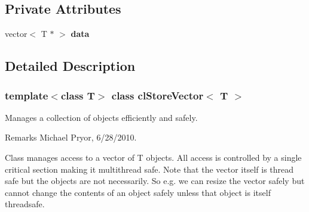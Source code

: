 \subsection*{Private Attributes}
\begin{DoxyCompactItemize}
\item 
\hypertarget{classcl_store_vector_a05885f4d26915b9a8b6bee3a2901dc19}{
vector$<$ T $\ast$ $>$ {\bfseries data}}
\label{classcl_store_vector_a05885f4d26915b9a8b6bee3a2901dc19}

\end{DoxyCompactItemize}


\subsection{Detailed Description}
\subsubsection*{template$<$class T$>$ class clStoreVector$<$ T $>$}

Manages a collection of objects efficiently and safely. \begin{DoxyRemark}{Remarks}
Michael Pryor, 6/28/2010.
\end{DoxyRemark}
Class manages access to a vector of T objects. All access is controlled by a single critical section making it multithread safe. Note that the vector itself is thread safe but the objects are not necessarily. So e.g. we can resize the vector safely but cannot change the contents of an object safely unless that object is itself threadsafe. 

